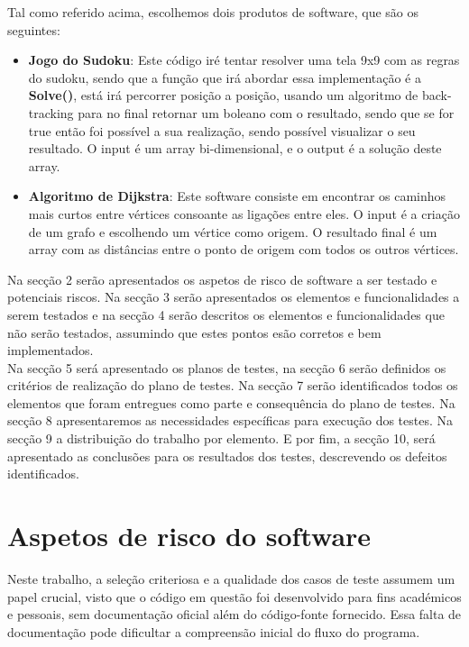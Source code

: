 \documentclass{article}
\begin{document}
\texttt{}\par  Tal como referido acima, escolhemos dois produtos de software, que são os seguintes:

\begin{itemize}
    \item \textbf{Jogo do Sudoku}: Este código iré tentar resolver uma tela 9x9 com as regras do sudoku, sendo que a função que irá abordar essa implementação é a \textbf{Solve()}, está irá percorrer posição a posição, usando um algoritmo de back-tracking para no final retornar um boleano com o resultado, sendo que se for true então foi possível a sua realização, sendo possível visualizar o seu resultado. O input é um array bi-dimensional, e o output é a solução deste array.
    \item \textbf{Algoritmo de Dijkstra}: Este software consiste em encontrar os caminhos mais curtos entre vértices consoante as ligações entre eles. O input é a criação de um grafo e escolhendo um vértice como origem. O resultado final é um array com as distâncias entre o ponto de origem com todos os outros vértices.

\end{itemize}
Na secção 2 serão apresentados os aspetos de risco de software a ser testado e potenciais riscos. Na secção 3 serão apresentados os elementos e funcionalidades a serem testados e na secção 4 serão descritos os elementos e funcionalidades que não serão testados, assumindo que estes pontos esão corretos e bem implementados. \\
Na secção 5 será apresentado os planos de testes, na secção 6 serão definidos os critérios de realização do plano de testes. Na secção 7 serão identificados todos os elementos que foram entregues como parte e consequência do plano de testes. Na secção 8 apresentaremos as necessidades específicas para execução dos testes. Na secção 9 a distribuição do trabalho por elemento. E por fim, a secção 10, será apresentado as conclusões para os resultados dos testes, descrevendo os defeitos identificados.

\section{Aspetos de risco do software}
\texttt{}\par Neste trabalho, a seleção criteriosa e a qualidade dos casos de teste assumem um papel crucial, visto que o código em questão foi desenvolvido para fins académicos e pessoais, sem documentação oficial além do código-fonte fornecido. Essa falta de documentação pode dificultar a compreensão inicial do fluxo do programa.
\end{document}
